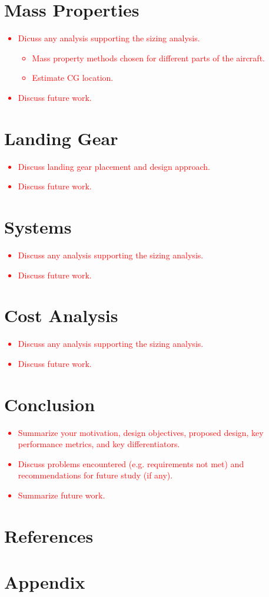 \documentclass[conf]{new-aiaa}
\begin{document}
\section{Mass Properties}
\textcolor{red}{
\begin{itemize}
    \item Dicuss any analysis supporting the sizing analysis.
    \begin{itemize}
        \item Mass property methods chosen for different parts of the aircraft.
        \item Estimate CG location.
    \end{itemize}
    \item Discuss future work.
\end{itemize}}

\section{Landing Gear}
\textcolor{red}{
\begin{itemize}
    \item Discuss landing gear placement and design approach.
    \item Discuss future work.
\end{itemize}}

\section{Systems}
\textcolor{red}{
\begin{itemize}
    \item Discuss any analysis supporting the sizing analysis.
    \item Discuss future work.
\end{itemize}}

\section{Cost Analysis}
\textcolor{red}{
\begin{itemize}
    \item Discuss any analysis supporting the sizing analysis.
    \item Discuss future work.
\end{itemize}}

\section{Conclusion}
\textcolor{red}{
\begin{itemize}
    \item Summarize your motivation, design objectives, proposed design, key performance metrics, and key differentiators.
    \item Discuss problems encountered (e.g. requirements not met) and recommendations for future study (if any).
    \item Summarize future work.
\end{itemize}}

\section{References}


\section{Appendix}
\end{document}
